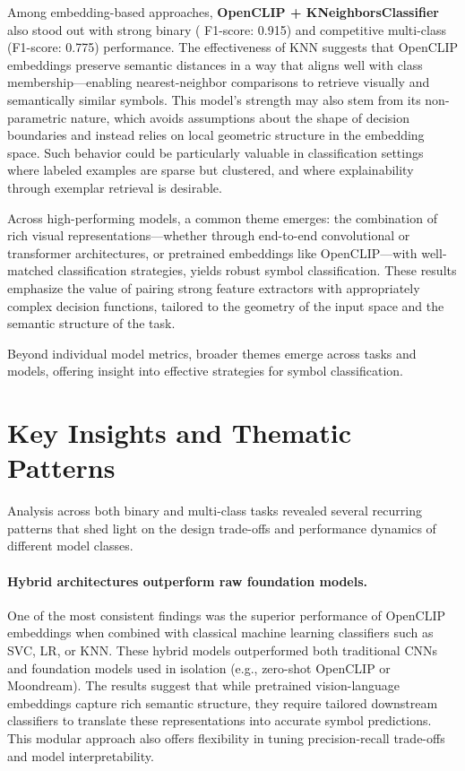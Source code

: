 Among embedding-based approaches, \textbf{OpenCLIP + KNeighborsClassifier} also stood out with strong binary (
F1-score: 0.915) and competitive multi-class (F1-score: 0.775) performance. The effectiveness of KNN suggests that
OpenCLIP embeddings preserve semantic distances in a way that aligns well with class membership—enabling
nearest-neighbor comparisons to retrieve visually and semantically similar symbols. This model’s strength may also
stem from its non-parametric nature, which avoids assumptions about the shape of decision boundaries and instead
relies on local geometric structure in the embedding space. Such behavior could be particularly valuable in
classification settings where labeled examples are sparse but clustered, and where explainability through exemplar
retrieval is desirable.

Across high-performing models, a common theme emerges: the combination of rich visual representations—whether
through end-to-end convolutional or transformer architectures, or pretrained embeddings like OpenCLIP—with
well-matched classification strategies, yields robust symbol classification. These results emphasize the value of
pairing strong feature extractors with appropriately complex decision functions, tailored to the geometry of the
input space and the semantic structure of the task.

Beyond individual model metrics, broader themes emerge across tasks and models, offering insight into effective
strategies for symbol classification.

\section{Key Insights and Thematic Patterns}
\label{subsec:key-insights}

Analysis across both binary and multi-class tasks revealed several recurring patterns that shed light on the design
trade-offs and performance dynamics of different model classes.

\paragraph{Hybrid architectures outperform raw foundation models.}
One of the most consistent findings was the superior performance of OpenCLIP embeddings when combined with classical
machine learning classifiers such as \ac{SVC}, \ac{LR}, or \ac{KNN}. These hybrid models outperformed both
traditional \ac{CNN}s and foundation models used in isolation (e.g., zero-shot OpenCLIP or Moondream). The results
suggest that while pretrained vision-language embeddings capture rich semantic structure, they require tailored
downstream classifiers to translate these representations into accurate symbol predictions. This modular approach
also offers flexibility in tuning precision-recall trade-offs and model interpretability.


